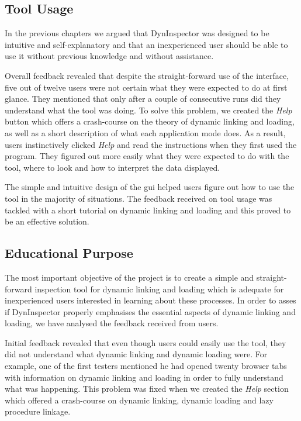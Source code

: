 \subsection{Tool Usage}

In the previous chapters we argued that DynInspector was designed to be intuitive and self-explanatory and that an inexperienced user should be able to use it without previous knowledge and without assistance.

Overall feedback revealed that despite the straight-forward use of the interface, five out of twelve users were not certain what they were expected to do at first glance. They mentioned that only after a couple of consecutive runs did they understand what the tool was doing. To solve this problem, we created the \textit{Help} button which offers a crash-course on the theory of dynamic linking and loading, as well as a short description of what each application mode does. As a result, users instinctively clicked \textit{Help} and read the instructions when they first used the program. They figured out more easily what they were expected to do with the tool, where to look and how to interpret the data displayed.

The simple and intuitive design of the gui helped users figure out how to use the tool in the majority of situations. The feedback received on tool usage was tackled with a short tutorial on dynamic linking and loading and this proved to be an effective solution.

\subsection{Educational Purpose}

The most important objective of the project is to create a simple and straight-forward inspection tool for dynamic linking and loading which is adequate for inexperienced users interested in learning about these processes. In order to asses if DynInspector properly emphasises the essential aspects of dynamic linking and loading, we have analysed the feedback received from users.

Initial feedback revealed that even though users could easily use the tool, they did not understand what dynamic linking and dynamic loading were. For example, one of the first testers mentioned he had opened twenty browser tabs with information on dynamic linking and loading in order to fully understand what was happening. This problem was fixed when we created the \textit{Help} section which offered a crash-course on dynamic linking, dynamic loading and lazy procedure linkage.

